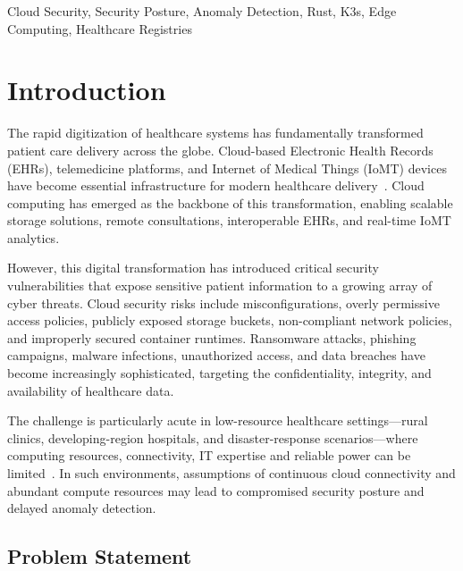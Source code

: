 \documentclass{ieeeaccess}
\begin{document}
\begin{keywords}
Cloud Security, Security Posture, Anomaly Detection, Rust, K3s, Edge Computing, Healthcare Registries
\end{keywords}

\titlepgskip=-15pt

\maketitle
\section{Introduction}
\label{sec:introduction}

The rapid digitization of healthcare systems has fundamentally transformed patient care delivery across the globe. Cloud-based Electronic Health Records (EHRs), telemedicine platforms, and Internet of Medical Things (IoMT) devices have become essential infrastructure for modern healthcare delivery~\cite{b1,b2}. Cloud computing has emerged as the backbone of this transformation, enabling scalable storage solutions, remote consultations, interoperable EHRs, and real-time IoMT analytics.

However, this digital transformation has introduced critical security vulnerabilities that expose sensitive patient information to a growing array of cyber threats. Cloud security risks include misconfigurations, overly permissive access policies, publicly exposed storage buckets, non-compliant network policies, and improperly secured container runtimes. Ransomware attacks, phishing campaigns, malware infections, unauthorized access, and data breaches have become increasingly sophisticated, targeting the confidentiality, integrity, and availability of healthcare data.

The challenge is particularly acute in low-resource healthcare settings---rural clinics, developing-region hospitals, and disaster-response scenarios---where computing resources, connectivity, IT expertise and reliable power can be limited~\cite{b3,b4}. In such environments, assumptions of continuous cloud connectivity and abundant compute resources may lead to compromised security posture and delayed anomaly detection.

\subsection{Problem Statement}
\label{subsec:problem}
\end{document}
